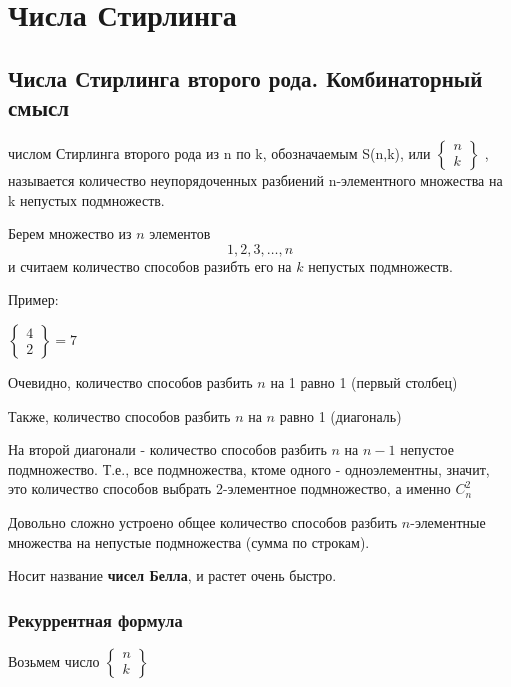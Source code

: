 \section{Числа Стирлинга}

\subsection{Числа Стирлинга второго рода. Комбинаторный смысл}

числом Стирлинга второго рода из n по k, обозначаемым S(n,k), или
$\begin{Bmatrix}
n \\
k
\end{Bmatrix}$
, называется количество неупорядоченных разбиений n-элементного множества на k непустых подмножеств.


Берем множество из $ n $ элементов 
$$
1,2,3,\ldots,n
$$
и считаем количество способов
разибть его на $ k $ непустых подмножеств.


Пример:

$\begin{Bmatrix}
4 \\
2
\end{Bmatrix} = 7$


Очевидно, количество способов разбить $ n $ на 1 равно 1 (первый столбец)

Также, количество способов разбить $ n $ на $ n $ равно 1 (диагональ)

На второй диагонали - количество способов разбить $ n $ на $ n-1 $ непустое подмножество. 
Т.е., все подмножества, ктоме одного - одноэлементны, значит, это количество способов выбрать 2-элементное подмножество, а именно $ C_{n}^{2} $

Довольно сложно устроено общее количество способов разбить $ n$-элементные множества на непустые подмножества (сумма по строкам).

Носит название \textbf{чисел Белла}, и растет очень быстро.

\subsubsection{Рекуррентная формула}

Возьмем число 
$\begin{Bmatrix}
n \\
k
\end{Bmatrix}$

